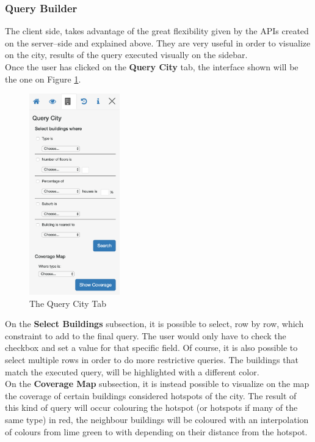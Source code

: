 \subsubsection{Query Builder}
The client side, takes advantage of the great flexibility given by the APIs created on the server--side and explained above. They are very useful in order to visualize on the city, results of the query executed visually on the sidebar.\\
Once the user has clicked on the {\bf Query City} tab, the interface shown will be the one on Figure \ref{fig:query_city_tab}.\\ 
\begin{figure}[H]
\centering
\includegraphics[width=0.35\textwidth]{chapter3/images/query_city_tab}
\caption{The Query City Tab}
\label{fig:query_city_tab}
\end{figure}
On the {\bf Select Buildings} subsection, it is possible to select, row by row, which constraint to add to the final query. The user would only have to check the checkbox and set a value for that specific field. Of course, it is also possible to select multiple rows in order to do more restrictive queries. The buildings that match the executed query, will be highlighted with a different color.\\

On the {\bf Coverage Map} subsection, it is instead possible to visualize on the map the coverage of certain buildings considered hotspots of the city. The result of this kind of query will occur colouring the hotspot (or hotspots if many of the same type) in red, the neighbour buildings will be coloured with an interpolation of colours from lime green to with depending on their distance from the hotspot.\\

